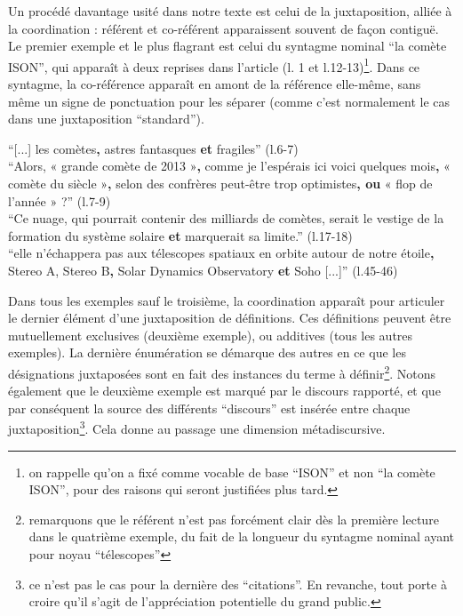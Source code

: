 \documentclass[a4paper,10pt]{article}
\begin{document}
			Un procédé davantage usité dans notre texte est celui de la juxtaposition, alliée à la coordination : référent et co-référent apparaissent souvent de façon contiguë.\\
			Le premier exemple et le plus flagrant est celui du syntagme nominal ``la comète ISON'', qui apparaît à deux reprises dans l'article (l. 1 et l.12-13)\footnote{on rappelle qu'on a fixé comme vocable de base ``ISON'' et non ``la comète ISON'', pour des raisons qui seront justifiées plus tard.}. Dans ce syntagme, la co-référence apparaît en amont de la référence elle-même, sans même un signe de ponctuation pour les séparer (comme c'est normalement le cas dans une juxtaposition ``standard'').
			\begin{center}
				\footnotesize
				\begin{minipage}{0.7\textwidth}
					``[...] les comètes\textbf{,} astres fantasques \textbf{et} fragiles'' (l.6-7)\\
					``Alors, « grande comète de 2013 »\textbf{,} comme je l'espérais ici voici quelques mois\textbf{,} « comète du siècle »\textbf{,} selon des confrères peut-être trop optimistes\textbf{, ou} « flop de l'année » ?'' (l.7-9)\\
					``Ce nuage, qui pourrait contenir des milliards de comètes, serait le vestige de la formation du système solaire \textbf{et} marquerait sa limite.'' (l.17-18)\\
					``elle n'échappera pas aux télescopes spatiaux en orbite autour de notre étoile\textbf{,} Stereo A, Stereo B\textbf{,} Solar Dynamics Observatory \textbf{et} Soho [...]'' (l.45-46)
				\end{minipage}
			\end{center}
			Dans tous les exemples sauf le troisième, la coordination apparaît pour articuler le dernier élément d'une juxtaposition de définitions. Ces définitions peuvent être mutuellement exclusives (deuxième exemple), ou additives (tous les autres exemples). La dernière énumération se démarque des autres en ce que les désignations juxtaposées sont en fait des instances du terme à définir\footnote{remarquons que le référent n'est pas forcément clair dès la première lecture dans le quatrième exemple, du fait de la longueur du syntagme nominal ayant pour noyau ``télescopes''}. Notons également que le deuxième exemple est marqué par le discours rapporté, et que par conséquent la source des différents ``discours'' est insérée entre chaque juxtaposition\footnote{ce n'est pas le cas pour la dernière des ``citations''. En revanche, tout porte à croire qu'il s'agit de l'appréciation potentielle du grand public.}. Cela donne au passage une dimension métadiscursive.\\
\end{document}
